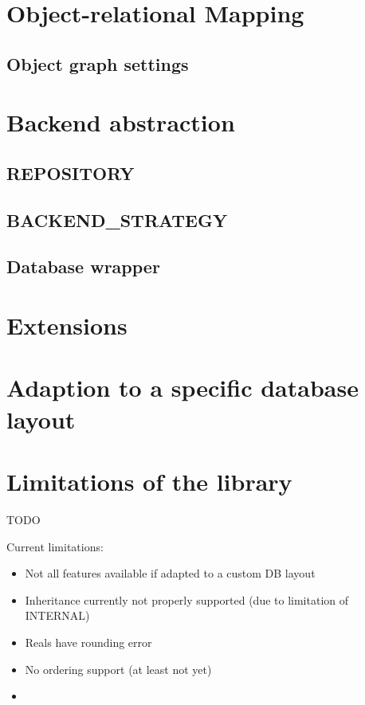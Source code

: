 \section{Object-relational Mapping}
\label{section:ORM}

\subsection{Object graph settings}


\section{Backend abstraction}

\subsection{REPOSITORY}

\subsection{BACKEND\_STRATEGY}

\subsection{Database wrapper}


\section{Extensions}

\section{Adaption to a specific database layout}


\section{Limitations of the library}
TODO

Current limitations:
\begin{itemize}
\item Not all features available if adapted to a custom DB layout 
\item Inheritance currently not properly supported (due to limitation of INTERNAL)
\item Reals have rounding error
\item No ordering support (at least not yet)
\item
\end{itemize}

